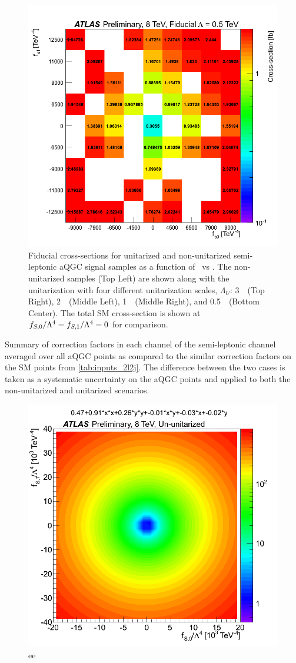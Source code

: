 \begin{figure}[ht]
\includegraphics[width=.495\textwidth]{figures/aQGC/2l2j_fiducial_p5TeV_noratio.png}
\caption{Fiducial cross-sections for unitarized and non-unitarized semi-leptonic 
aQGC signal samples as a function of \fszero~vs \fsone.
The non-unitarized samples (Top Left) are shown along with the unitarization with 
four different unitarization scales, $\Lambda_U$: 3~\TeV~(Top Right),
2~\TeV~(Middle Left), 1~\TeV~(Middle Right), and 0.5~\TeV~(Bottom Center).
The total SM cross-section is shown at $f_{S,0}/\Lambda^4=f_{S,1}/\Lambda^4=0$ for comparison.}
\label{fig:2l2j_aqgc_fiducial_xsec}
\end{figure}

\begin{table}[htb]
\centering

\caption{Summary of correction factors in each channel of the semi-leptonic channel 
averaged over all aQGC points as compared to the similar correction factors on the SM 
points from \tab\ref{tab:inputs_2l2j}. The difference between the two cases
is taken as a systematic uncertainty on the aQGC points and applied to both the 
non-unitarized and unitarized scenarios.}
\label{tab:aqgc_cfactor_2l2j_summary}
\end{table}

\begin{figure}[tb]
\centering
\includegraphics[width=.7\textwidth]{figures/aqgc_fits/ee/2l2jUnUnit_ee.png}
\caption{ee}
\label{fig:aqgc_fit_ee_ununit}
\end{figure}

